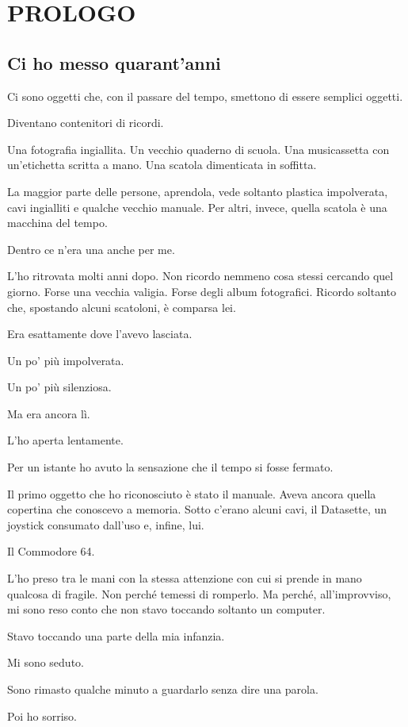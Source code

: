 \documentclass{article}
\author{HP}
\date{2026-07-26}
\begin{document}
\section{PROLOGO}
\subsection[Ci ho messo quarant{}'anni]{Ci ho messo quarant'anni}
Ci sono oggetti che, con il passare del tempo, smettono di essere semplici oggetti.

Diventano contenitori di ricordi.

Una fotografia ingiallita. Un vecchio quaderno di scuola. Una musicassetta con un'etichetta scritta a mano. Una scatola
dimenticata in soffitta.

La maggior parte delle persone, aprendola, vede soltanto plastica impolverata, cavi ingialliti e qualche vecchio
manuale. Per altri, invece, quella scatola è una macchina del tempo.

Dentro ce n'era una anche per me.

L'ho ritrovata molti anni dopo. Non ricordo nemmeno cosa stessi cercando quel giorno. Forse una vecchia valigia. Forse
degli album fotografici. Ricordo soltanto che, spostando alcuni scatoloni, è comparsa lei.

Era esattamente dove l'avevo lasciata.

Un po' più impolverata.

Un po' più silenziosa.

Ma era ancora lì.

L'ho aperta lentamente.

Per un istante ho avuto la sensazione che il tempo si fosse fermato.

Il primo oggetto che ho riconosciuto è stato il manuale. Aveva ancora quella copertina che conoscevo a memoria. Sotto
c'erano alcuni cavi, il Datasette, un joystick consumato dall'uso e, infine, lui.

Il Commodore 64.

L'ho preso tra le mani con la stessa attenzione con cui si prende in mano qualcosa di fragile. Non perché temessi di
romperlo. Ma perché, all'improvviso, mi sono reso conto che non stavo toccando soltanto un computer.

Stavo toccando una parte della mia infanzia.

Mi sono seduto.

Sono rimasto qualche minuto a guardarlo senza dire una parola.

Poi ho sorriso.
\end{document}
